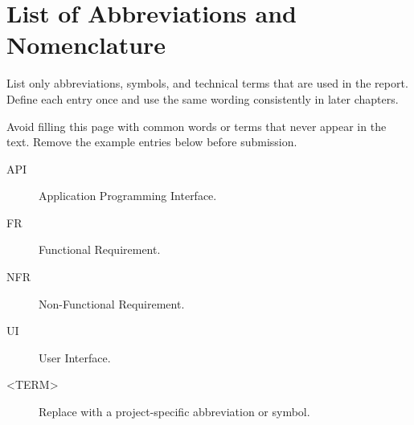 \chapter*{List of Abbreviations and Nomenclature}

List only abbreviations, symbols, and technical terms that are used in the report. Define each entry once and use the same wording consistently in later chapters.

Avoid filling this page with common words or terms that never appear in the text. Remove the example entries below before submission.

\begin{description}
    \item[API] Application Programming Interface.
    \item[FR] Functional Requirement.
    \item[NFR] Non-Functional Requirement.
    \item[UI] User Interface.
    \item[\textless TERM\textgreater] Replace with a project-specific abbreviation or symbol.
\end{description}

\clearpage